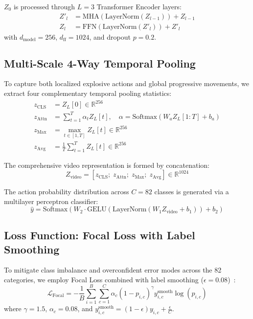 \documentclass[10pt,journal,compsoc]{IEEEtran}
\begin{document}
$Z_0$ is processed through $L=3$ Transformer Encoder layers:
\begin{align}
Z'_l &= \text{MHA}(\text{LayerNorm}(Z_{l-1})) + Z_{l-1} \\
Z_l &= \text{FFN}(\text{LayerNorm}(Z'_l)) + Z'_l
\end{align}
with $d_{\text{model}} = 256$, $d_{\text{ff}} = 1024$, and dropout $p = 0.2$.

\subsection{Multi-Scale 4-Way Temporal Pooling}
To capture both localized explosive actions and global progressive movements, we extract four complementary temporal pooling statistics:
\begin{align}
z_{\text{CLS}} &= Z_L[0] \in \mathbb{R}^{256} \\
z_{\text{Attn}} &= \sum_{t=1}^T \alpha_t Z_L[t], \quad \alpha = \text{Softmax}(W_a Z_L[1:T] + b_a) \\
z_{\text{Max}} &= \max_{t \in [1, T]} Z_L[t] \in \mathbb{R}^{256} \\
z_{\text{Avg}} &= \frac{1}{T} \sum_{t=1}^T Z_L[t] \in \mathbb{R}^{256}
\end{align}

The comprehensive video representation is formed by concatenation:
\begin{equation}
Z_{\text{video}} = [z_{\text{CLS}}; \; z_{\text{Attn}}; \; z_{\text{Max}}; \; z_{\text{Avg}}] \in \mathbb{R}^{1024}
\end{equation}

The action probability distribution across $C = 82$ classes is generated via a multilayer perceptron classifier:
\begin{equation}
\hat{y} = \text{Softmax}\left(W_2 \cdot \text{GELU}(\text{LayerNorm}(W_1 Z_{\text{video}} + b_1)) + b_2\right)
\end{equation}

\subsection{Loss Function: Focal Loss with Label Smoothing}
To mitigate class imbalance and overconfident error modes across the 82 categories, we employ Focal Loss combined with label smoothing ($\epsilon = 0.08$)~\cite{lin2017focal, szegedy2016rethinking}:
\begin{equation}
\mathcal{L}_{\text{Focal}} = -\frac{1}{B} \sum_{i=1}^B \sum_{c=1}^C \alpha_c (1 - p_{i, c})^\gamma y_{i, c}^{\text{smooth}} \log(p_{i, c})
\end{equation}
where $\gamma = 1.5$, $\alpha_c = 0.08$, and $y_{i, c}^{\text{smooth}} = (1 - \epsilon) y_{i, c} + \frac{\epsilon}{C}$.
\end{document}
